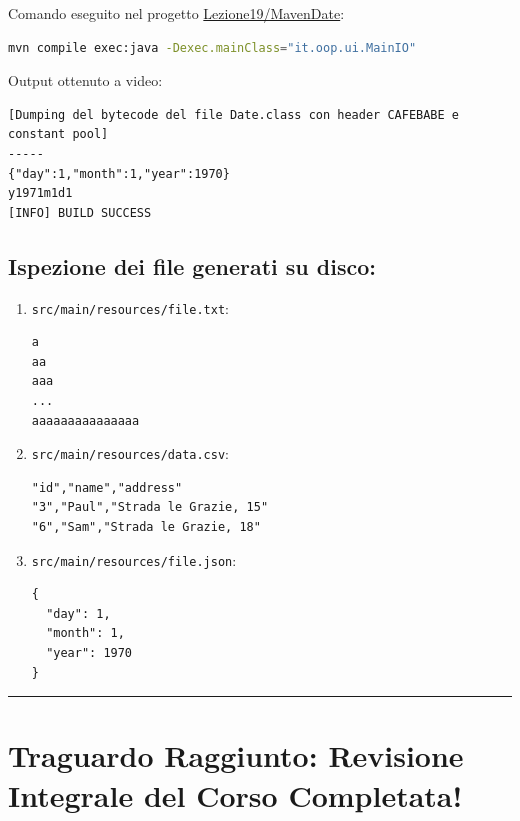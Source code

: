 \documentclass[11pt,a4paper,oneside]{report}
\newcommand{\passthrough}[1]{#1}
\begin{document}
Comando eseguito nel progetto
\href{file:///home/wally/Documenti/GitHub/Programmazione-II/25-26/Teoria-e-Esercitazioni/Codice-20260902/Lezione19/MavenDate}{Lezione19/MavenDate}:

\begin{lstlisting}[language=bash]
mvn compile exec:java -Dexec.mainClass="it.oop.ui.MainIO"
\end{lstlisting}

Output ottenuto a video:

\begin{lstlisting}
[Dumping del bytecode del file Date.class con header CAFEBABE e constant pool]
-----
{"day":1,"month":1,"year":1970}
y1971m1d1
[INFO] BUILD SUCCESS
\end{lstlisting}

\subsection{Ispezione dei file generati su
disco:}\label{chap19_ispezione-dei-file-generati-su-disco}

\begin{enumerate}
\def\labelenumi{\arabic{enumi}.}
\item
  \passthrough{\lstinline!src/main/resources/file.txt!}:

\begin{lstlisting}
a
aa
aaa
...
aaaaaaaaaaaaaaa
\end{lstlisting}
\item
  \passthrough{\lstinline!src/main/resources/data.csv!}:

\begin{lstlisting}
"id","name","address"
"3","Paul","Strada le Grazie, 15"
"6","Sam","Strada le Grazie, 18"
\end{lstlisting}
\item
  \passthrough{\lstinline!src/main/resources/file.json!}:

\begin{lstlisting}
{
  "day": 1,
  "month": 1,
  "year": 1970
}
\end{lstlisting}
\end{enumerate}

\begin{center}\rule{0.5\linewidth}{0.5pt}\end{center}

\section{Traguardo Raggiunto: Revisione Integrale del Corso
Completata!}\label{chap19_traguardo-raggiunto-revisione-integrale-del-corso-completata}
\end{document}
